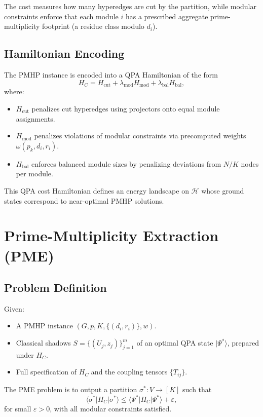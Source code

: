 \documentclass[11pt]{article}
\begin{document}
The cost measures how many hyperedges are cut by the partition, while modular constraints enforce that each module $i$ has a prescribed aggregate prime-multiplicity footprint (a residue class modulo $d_i$).

\subsection{Hamiltonian Encoding}

The PMHP instance is encoded into a QPA Hamiltonian of the form
\[
  H_C = H_{\text{cut}} + \lambda_{\text{mod}} H_{\text{mod}} + \lambda_{\text{bal}} H_{\text{bal}},
\]
where:

\begin{itemize}
  \item $H_{\text{cut}}$ penalizes cut hyperedges using projectors onto equal module assignments.
  \item $H_{\text{mod}}$ penalizes violations of modular constraints via precomputed weights $\omega(p_k,d_i,r_i)$.
  \item $H_{\text{bal}}$ enforces balanced module sizes by penalizing deviations from $N/K$ nodes per module.
\end{itemize}

This QPA cost Hamiltonian defines an energy landscape on $\mathcal{H}$ whose ground states correspond to near-optimal PMHP solutions.

\section{Prime-Multiplicity Extraction (PME)}

\subsection{Problem Definition}

\begin{definition}
Given:
\begin{itemize}
  \item A PMHP instance $(G,p,K,\{(d_i,r_i)\},w)$.
  \item Classical shadows $S = \{(U_j,z_j)\}_{j=1}^m$ of an optimal QPA state $|\Psi^*\rangle$, prepared under $H_C$.
  \item Full specification of $H_C$ and the coupling tensors $\{T_{ij}\}$.
\end{itemize}
The PME problem is to output a partition $\sigma^*:V\to[K]$ such that
\[
  \langle \sigma^*|H_C|\sigma^*\rangle
    \le \langle \Psi^*|H_C|\Psi^*\rangle + \varepsilon,
\]
for small $\varepsilon > 0$, with all modular constraints satisfied.
\end{definition}
\end{document}
